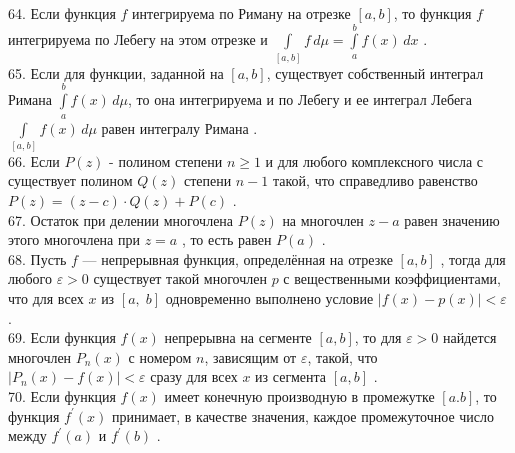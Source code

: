 \documentclass[12pt]{article}
\begin{document}
{64. Если функция ${\displaystyle f}$ интегрируема по Риману на отрезке ${\displaystyle [a,b]}$, то функция ${\displaystyle f}$ интегрируема по Лебегу на этом отрезке и ${\displaystyle \int \limits _{[a,b]} f \, d\mu=\int \limits _{a}^{b} f(x) \, dx}$ .\\

65. Если для функции, заданной на ${\displaystyle [a,b]}$, существует собственный интеграл Римана ${\displaystyle \int \limits _{a}^{b} f(x) \, d\mu}$, то она интегрируема и по Лебегу и ее интеграл Лебега ${\displaystyle \int \limits _{[a,b]} f(x) \, d\mu}$ равен интегралу Римана .\\

66. Если ${\displaystyle P(z)}$ - полином степени ${\displaystyle n \geq 1}$ и для любого комплексного числа ${\displaystyle с}$ существует полином ${\displaystyle Q(z)}$ степени ${\displaystyle n-1}$ такой, что справедливо равенство ${\displaystyle P(z)=(z-c)\cdot Q(z)+P(c)}$ .\\

67. Остаток при делении многочлена ${\displaystyle P(z)}$ на многочлен ${\displaystyle z-a}$ равен значению этого многочлена при ${\displaystyle z=a}$ , то есть равен ${\displaystyle P(a)}$ .\\

68. Пусть ${\displaystyle f}$ — непрерывная функция, определённая на отрезке ${\displaystyle [a,b]}$ , тогда для любого ${\displaystyle \varepsilon >0}$ существует такой многочлен ${\displaystyle p}$  с вещественными коэффициентами, что для всех ${\displaystyle x}$  из ${\displaystyle [a,\;b]}$ одновременно выполнено условие ${\displaystyle |f(x)-p(x)|<\varepsilon }$ .\\

69. Если функция ${\displaystyle f(x)}$ непрерывна на сегменте ${\displaystyle [a,b]}$, то для ${\displaystyle \varepsilon>0}$ найдется многочлен ${\displaystyle P_n(x)}$ с номером ${\displaystyle n}$, зависящим от ${\displaystyle \varepsilon}$, такой, что ${\displaystyle |P_n(x)-f(x)|<\varepsilon}$ сразу для всех ${\displaystyle x}$ из сегмента ${\displaystyle [a,b]}$ .\\

70. Если функция ${\displaystyle f(x)}$ имеет конечную производную в промежутке ${\displaystyle [a.b]}$, то функция ${\displaystyle f^{\prime}(x)}$ принимает, в качестве значения, каждое промежуточное число между ${\displaystyle f^{\prime}(a)}$ и ${\displaystyle f^{\prime}(b)}$ .\\

}
\end{document}
